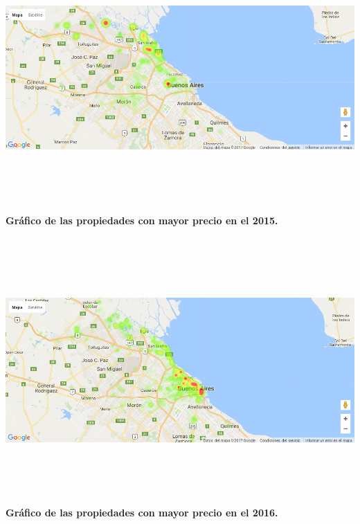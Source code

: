 \documentclass[a4paper, 10pt]{article}
\begin{document}
        		\begin{center}
             	\includegraphics[width=7in, height=4in]{images/ubicP2015}
             	\textbf{Gráfico de las propiedades con mayor precio en el 2015.}
        		\end{center}
        		\begin{center}
              	\includegraphics[width=7in, height=4in]{images/ubicP2016}
             	\textbf{Gráfico de las propiedades con mayor precio en el 2016.}
        		\end{center}
\end{document}
